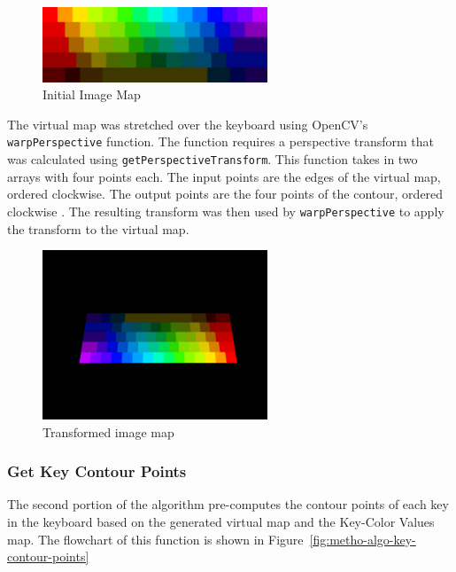 \documentclass{report}
\begin{document}
\begin{figure}[H]
	\centering
	\includegraphics[width=0.6\textwidth]{image-map.png}
	\caption{Initial Image Map}
	\label{fig:metho-algo-key-map}
	\centering
\end{figure}

The virtual map was stretched over the keyboard using OpenCV's
\texttt{warpPerspective} function. The function requires a perspective transform
that was calculated using \texttt{getPerspectiveTransform}. This function takes
in two arrays with four points each. The input points are the edges of the
virtual map, ordered clockwise. The output points are the four points of the
contour, ordered clockwise \parencite{opencv-image-transform}. The resulting
transform was then used by \texttt{warpPerspective} to apply the transform to
the virtual map.

\begin{figure}[H]
	\centering
	\includegraphics[width=0.6\textwidth]{transformed-image-map.png}
	\caption{Transformed image map}
	\centering
\end{figure}

\subsubsection{Get Key Contour Points}
The second portion of the algorithm pre-computes the contour points of each key
in the keyboard based on the generated virtual map and the Key-Color Values map.
The flowchart of this function is shown in
Figure~\ref{fig:metho-algo-key-contour-points}
\end{document}
